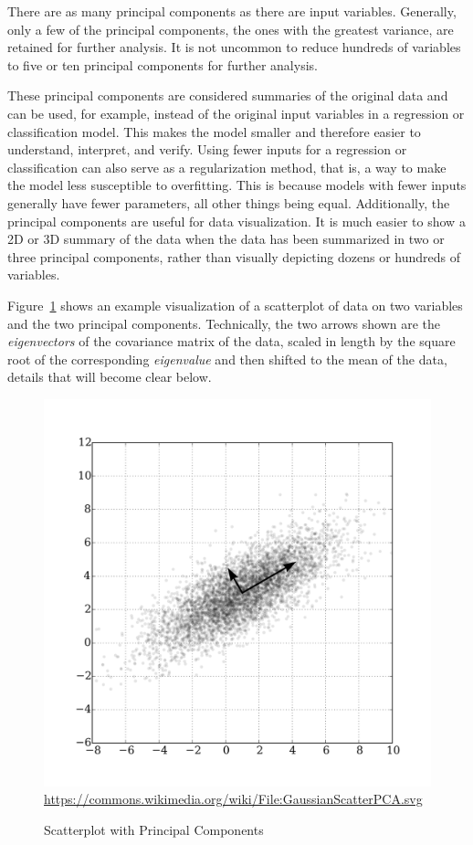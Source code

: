 There are as many principal components as there are input variables. Generally, only a few of the principal components, the ones with the greatest variance, are retained for further analysis. It is not uncommon to reduce hundreds of variables to five or ten principal components for further analysis.

These principal components are considered summaries of the original data and can be used, for example, instead of the original input variables in a regression or classification model. This makes the model smaller and therefore easier to understand, interpret, and verify. Using fewer inputs for a regression or classification can also serve as a regularization method, that is, a way to make the model less susceptible to overfitting. This is because models with fewer inputs generally have fewer parameters, all other things being equal. Additionally, the principal components are useful for data visualization. It is much easier to show a 2D or 3D summary of the data when the data has been summarized in two or three principal components, rather than visually depicting dozens or hundreds of variables. 

Figure~\ref{fig:pca1} shows an example visualization of a scatterplot of data on two variables and the two principal components. Technically, the two arrows shown are the \emph{eigenvectors} of the covariance matrix of the data, scaled in length by the square root of the corresponding \emph{eigenvalue} and then shifted to the mean of the data, details that will become clear below.

\begin{figure}
\centering
\includegraphics[width=.75\textwidth]{GaussianScatterPCA.svg.png} \\
\scriptsize
\url{https://commons.wikimedia.org/wiki/File:GaussianScatterPCA.svg} \\
\caption{Scatterplot with Principal Components}
\label{fig:pca1}
\end{figure}


